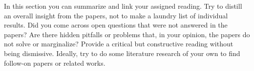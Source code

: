 In this section you can summarize and link your assigned reading. Try to distill an overall insight 
from the papers, not to make a laundry list of individual results. Did you come across open questions 
that were not answered in the papers? Are there hidden pitfalls or problems that, in your opinion, the 
papers do not solve or marginalize? Provide a critical but constructive reading without being dismissive. 
Ideally, try to do some literature research of your own to find follow-on papers or related works. 
